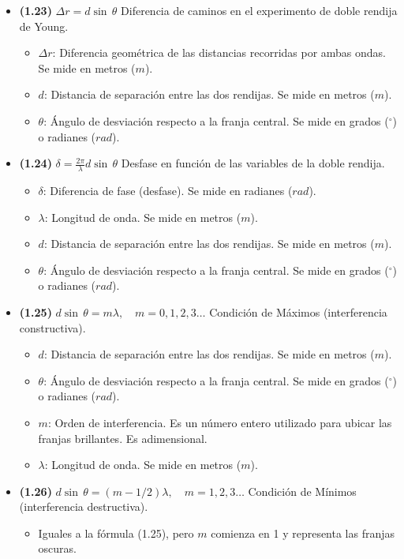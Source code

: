 \documentclass{article}
\begin{document}
			\begin{itemize}
				\item \textbf{(1.23)} $\boxed{\Delta r=d\sin\,\theta}$ Diferencia de caminos en el experimento de doble rendija de Young.
					\begin{itemize}
						\item $\Delta r$: Diferencia geométrica de las distancias recorridas por ambas ondas. Se mide en metros ($m$).
						\item $d$: Distancia de separación entre las dos rendijas. Se mide en metros ($m$).
						\item $\theta$: Ángulo de desviación respecto a la franja central. Se mide en grados ($^\circ$) o radianes ($rad$).
					\end{itemize}    

				\item \textbf{(1.24)} $\boxed{\delta=\frac{2\pi}{\lambda}d\sin\,\theta}$ Desfase en función de las variables de la doble rendija.
					\begin{itemize}
						\item $\delta$: Diferencia de fase (desfase). Se mide en radianes ($rad$).
						\item $\lambda$: Longitud de onda. Se mide en metros ($m$).
						\item $d$: Distancia de separación entre las dos rendijas. Se mide en metros ($m$).
						\item $\theta$: Ángulo de desviación respecto a la franja central. Se mide en grados ($^\circ$) o radianes ($rad$).
					\end{itemize}

				\item \textbf{(1.25)} $\boxed{d\sin\,\theta=m\lambda, \quad m=0,1,2,3\dots}$ Condición de Máximos (interferencia constructiva).
					\begin{itemize}
						\item $d$: Distancia de separación entre las dos rendijas. Se mide en metros ($m$).
						\item $\theta$: Ángulo de desviación respecto a la franja central. Se mide en grados ($^\circ$) o radianes ($rad$).
						\item $m$: Orden de interferencia. Es un número entero utilizado para ubicar las franjas brillantes. Es adimensional.
						\item $\lambda$: Longitud de onda. Se mide en metros ($m$).
					\end{itemize}

				\item \textbf{(1.26)} $\boxed{d\sin\,\theta=(m-1/2)\lambda, \quad m=1,2,3\dots}$ Condición de Mínimos (interferencia destructiva).
					\begin{itemize}
						\item Iguales a la fórmula (1.25), pero $m$ comienza en 1 y representa las franjas oscuras.
					\end{itemize}


\end{itemize}
\end{document}
